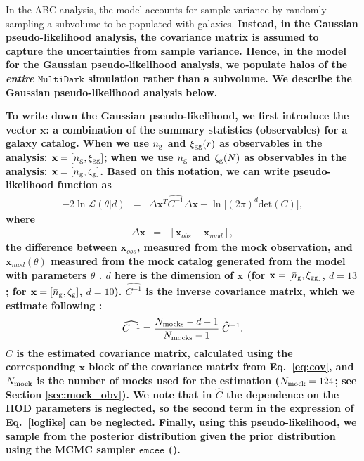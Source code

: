 \documentclass[fleqn,usenatbib]{mnras}
\begin{document}
In the ABC analysis, the model accounts for sample variance by randomly sampling a subvolume to be 
populated with galaxies. 
{\bf \color{dred} %
Instead, in the Gaussian pseudo-likelihood analysis, the covariance matrix is assumed to capture the
uncertainties from sample variance. Hence, in the model for the Gaussian pseudo-likelihood analysis, 
we populate halos of the {\em entire} $\mathtt{MultiDark}$ simulation rather than a subvolume.
We describe the Gaussian pseudo-likelihood analysis below.
}

{\bf \color{dred}
To write down the Gaussian pseudo-likelihood, we first introduce the vector $\mathbf{x}$: 
a combination of the summary statistics (observables) for a galaxy catalog. 
When we use $\bar{n}_{\mathrm{g}}$ and $\xi_{\mathrm{gg}}(r)$ as observables in the analysis: $\mathbf{x} = [\bar{n}_{\mathrm{g}} , \xi_{\mathrm{gg}}]$;
when we use $\bar{n}_{\mathrm{g}}$ and $\mathcal{\zeta}_{\rm g}(N)$ as observables in the analysis: $\mathbf{x} = [\bar{n}_{\mathrm{g}} , \mathcal{\zeta}_{\rm g}]$.
Based on this notation, we can write pseudo-likelihood function as 
\begin{eqnarray}
-2 \ln \mathcal{L}(\theta | d) &=& \Delta \mathbf{x}^{T}\widehat{C^{-1}}\Delta \mathbf{x} + \ln\Big[(2\pi)^{d}\mathrm{det}(C)\Big], \label{loglike}
\end{eqnarray}
where 
\begin{eqnarray}
\Delta \mathbf{x} &=& [\mathbf{x}_{obs} -\mathbf{x}_{mod}], 
\end{eqnarray}
the difference between $\mathbf{x}_{obs}$, measured from the mock observation, 
and $\mathbf{x}_{mod}(\mathbb{\theta})$ measured from the mock catalog generated 
from the model with parameters $\theta$ .
$d$ here is the dimension of $\mathbf{x}$ (for $\mathbf{x} = [\bar{n}_{\mathrm{g}}, \xi_{\mathrm{gg}}]$, $d = 13$; 
for $\mathbf{x} = [\bar{n}_{\mathrm{g}}, \mathcal{\zeta}_{\rm g}]$, $d = 10$).  
$\widehat{C^{-1}}$ is the inverse covariance matrix, which we estimate following \cite{hartlap2007}:
\begin{eqnarray}
\widehat{C^{-1}} = \frac{N_{\rm mocks}-d - 1}{N_{\rm mocks} -1} \; \widehat{C}^{-1}.
\end{eqnarray}
$\widehat{C}$ is the estimated covariance matrix, calculated using the corresponding 
$\mathbf{x}$ block of the covariance matrix from Eq.~\ref{eq:cov}, and $N_{\rm mock}$ 
is the number of mocks used for the estimation ($N_{\rm mock} = 124$; see Section \ref{sec:mock_obv}).
We note that in $\widehat{C}$ the dependence on the HOD parameters is neglected, 
so the second term in the expression of Eq.~\ref{loglike} can be neglected. 
Finally, using this pseudo-likelihood, we sample from the posterior distribution 
given the prior distribution using the MCMC sampler $\mathtt{emcee}$ (\citealt{emcee}). 
}
\end{document}
